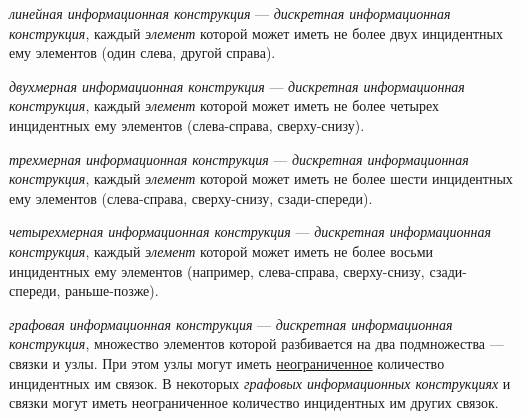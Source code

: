 \begin{SCn}

    \begin{scnindent}
    \end{scnindent}

\end{SCn}

\textit{линейная информационная конструкция} --- \textit{дискретная информационная конструкция}, каждый \textit{элемент} которой может иметь не более двух инцидентных ему элементов (один слева, другой справа).

\textit{двухмерная информационная конструкция} --- \textit{дискретная информационная конструкция}, каждый \textit{элемент} которой может иметь не более четырех инцидентных ему элементов (слева-справа, сверху-снизу).

\textit{трехмерная информационная конструкция} --- \textit{дискретная информационная конструкция}, каждый \textit{элемент} которой может иметь не более шести инцидентных ему элементов (слева-справа, сверху-снизу, сзади-спереди).

\textit{четырехмерная информационная конструкция} --- \textit{дискретная информационная конструкция}, каждый \textit{элемент} которой может иметь не более восьми инцидентных ему элементов (например, слева-справа, сверху-снизу, сзади-спереди, раньше-позже).

\textit{графовая информационная конструкция} --- \textit{дискретная информационная конструкция}, множество элементов которой разбивается на два подмножества --- связки и узлы.
При этом узлы могут иметь \underline{неограниченное} количество инцидентных им связок.
В некоторых \textit{графовых информационных конструкциях} и связки могут иметь неограниченное количество инцидентных им других связок.

